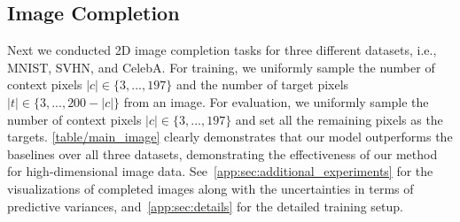 % 

\subsection{Image Completion}
\label{main:sec:experiments:imagecompletion}


Next we conducted 2D image completion tasks for three different datasets, i.e., MNIST, SVHN, and CelebA.
For training, we uniformly sample the number of context pixels $|c|\in\{3,...,197\}$ and the number of target pixels $|t|\in\{3,...,200-|c|\}$ from an image. For evaluation, we uniformly sample the number of context pixels $|c|\in\{3,...,197\}$ and set all the remaining pixels as the targets. \cref{table/main_image} clearly demonstrates that our model outperforms the baselines over all three datasets, demonstrating the effectiveness of our method for high-dimensional image data. See~\cref{app:sec:additional_experiments} for the visualizations of completed images along with the uncertainties in terms of predictive variances, and~\cref{app:sec:details} for the detailed training setup.


